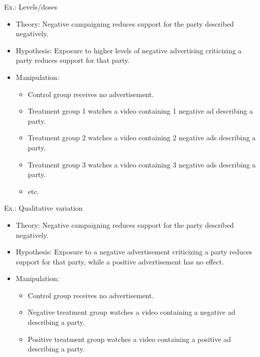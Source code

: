 \documentclass[
  ignorenonframetext,
]{beamer}
\providecommand{\tightlist}{%
  \setlength{\itemsep}{0pt}\setlength{\parskip}{0pt}}
\begin{document}
\begin{frame}{Ex.: Levels/doses}
\protect\hypertarget{ex.-levelsdoses}{}
\begin{itemize}
\tightlist
\item
  Theory: Negative campaigning reduces support for the party described
  negatively.
\item
  Hypothesis: Exposure to higher levels of negative advertising
  criticizing a party reduces support for that party.
\item
  Manipulation:

  \begin{itemize}
  \tightlist
  \item
    Control group receives no advertisement.
  \item
    Treatment group 1 watches a video containing 1 negative ad
    describing a party.
  \item
    Treatment group 2 watches a video containing 2 negative ads
    describing a party.
  \item
    Treatment group 3 watches a video containing 3 negative ads
    describing a party.
  \item
    etc.
  \end{itemize}
\end{itemize}
\end{frame}

\begin{frame}{Ex.: Qualitative variation}
\protect\hypertarget{ex.-qualitative-variation}{}
\small

\begin{itemize}
\item Theory: Negative campaigning reduces support for the party described negatively.
\item Hypothesis: Exposure to a negative advertisement criticizing a party reduces support for that party, while a positive advertisement has no effect.
\item Manipulation:
    \begin{itemize}\footnotesize
    \item Control group receives no advertisement. 
    \item Negative treatment group watches a video containing a negative ad describing a party.
    \item Positive treatment group watches a video containing a positive ad describing a party.
    \end{itemize}
\end{itemize}
\end{frame}
\end{document}
